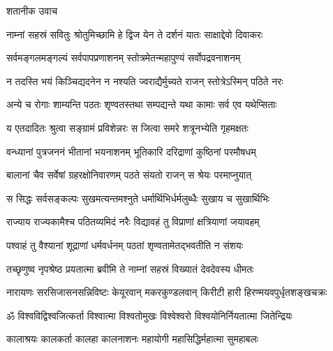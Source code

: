शतानीक उवाच

\twolineshloka
{नाम्नां सहस्रं सवितुः श्रोतुमिच्छामि हे द्विज}
{येन ते दर्शनं यातः साक्षाद्देवो दिवाकरः}

\twolineshloka
{सर्वमङ्गलमङ्गल्यं सर्वपापप्रणाशनम्}
{स्तोत्रमेतन्महापुण्यं सर्वोपद्रवनाशनम्}

\twolineshloka
{न तदस्ति भयं किञ्चिद्यदनेन न नश्यति}
{ज्वराद्यैर्मुच्यते राजन् स्तोत्रेऽस्मिन् पठिते नरः}

\twolineshloka
{अन्ये च रोगाः शाम्यन्ति पठतः शृण्वतस्तथा}
{सम्पद्यन्ते यथा कामाः सर्व एव यथेप्सिताः}

\twolineshloka
{य एतदादितः श्रुत्वा सङ्ग्रामं प्रविशेन्नरः}
{स जित्वा समरे शत्रूनभ्येति गृहमक्षतः}

\twolineshloka
{वन्ध्यानां पुत्रजननं भीतानां भयनाशनम्}
{भूतिकारि दरिद्राणां कुष्ठिनां परमौषधम्}

\twolineshloka
{बालानां चैव सर्वेषां ग्रहरक्षोनिवारणम्}
{पठते संयतो राजन् स श्रेयः परमाप्नुयात्}

\twolineshloka
{स सिद्धः सर्वसङ्कल्पः सुखमत्यन्तमश्नुते}
{धर्मार्थिभिर्धर्मलुब्धैः सुखाय च सुखार्थिभिः}

\twolineshloka
{राज्याय राज्यकामैश्च पठितव्यमिदं नरैः}
{विद्यावहं तु विप्राणां क्षत्रियाणां जयावहम्}

\twolineshloka
{पश्वाहं तु वैश्यानां शूद्राणां धर्मवर्धनम्}
{पठतां शृण्वतामेतद्भवतीति न संशयः}

\twolineshloka
{तच्छृणुष्व नृपश्रेष्ठ प्रयतात्मा ब्रवीमि ते}
{नाम्नां सहस्रं विख्यातं देवदेवस्य धीमतः}


\begin{minipage}{\linewidth}
\centering
{}
{नारायणः सरसिजासनसन्निविष्टः}
{केयूरवान् मकरकुण्डलवान् किरीटी}
{हारी हिरण्मयवपुर्धृतशङ्खचक्रः}
\end{minipage}

\resetShloka
\twolineshloka
{ॐ विश्वविद्विश्वजित्कर्ता विश्वात्मा विश्वतोमुखः}
{विश्वेश्वरो विश्वयोनिर्नियतात्मा जितेन्द्रियः}%

\twolineshloka
{कालाश्रयः कालकर्ता कालहा कालनाशनः}
{महायोगी महासिद्धिर्महात्मा सुमहाबलः}%

